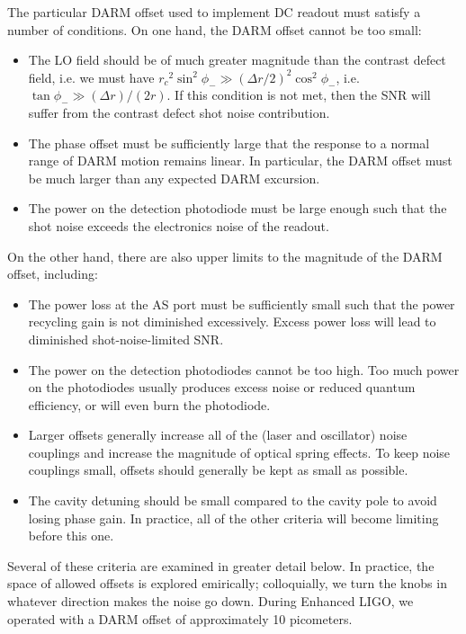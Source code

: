 The particular DARM offset used to implement DC readout must satisfy a
number of conditions.  On one hand, the DARM offset cannot be too small:
\begin{itemize}
\item The LO field should be of much greater magnitude than the contrast
  defect field, i.e. we must have ${r_c}^2\sin^2\phi_- \gg (\Delta
  r/2)^2 \cos^2\phi_-$, i.e. $\tan \phi_- \gg (\Delta r)/(2r)$.  If this condition is not met, then the SNR
  will suffer from the contrast defect shot noise contribution.
\item The phase offset must be sufficiently large that the response to
  a normal range of DARM motion remains linear.  In particular, the
  DARM offset must be much larger than any expected DARM excursion.
\item The power on the detection photodiode must be large enough such
  that the shot noise exceeds the electronics noise of the readout.
\end{itemize}
On the other hand, there are also upper limits to the magnitude of the
DARM offset, including:
\begin{itemize}
\item The power loss at the AS port must be sufficiently small such
  that the power recycling gain is not diminished excessively.  Excess
  power loss will lead to diminished shot-noise-limited SNR.
\item The power on the detection photodiodes cannot be too high.  Too
  much power on the photodiodes usually produces excess noise or
  reduced quantum efficiency, or will even burn the photodiode.
\item Larger offsets generally increase all of the (laser and
  oscillator) noise couplings and increase the magnitude of optical
  spring effects.  To keep noise couplings small, offsets should
  generally be kept as small as possible.
\item The cavity detuning should be small compared to the cavity pole
  to avoid losing phase gain.  In practice, all of the other criteria
  will become limiting before this one.
\end{itemize}
Several of these criteria are examined in greater detail below.  In
practice, the space of allowed offsets is explored emirically;
colloquially, we turn the knobs in whatever direction makes the noise
go down.  During Enhanced LIGO, we operated with a DARM offset of
approximately 10 picometers.

